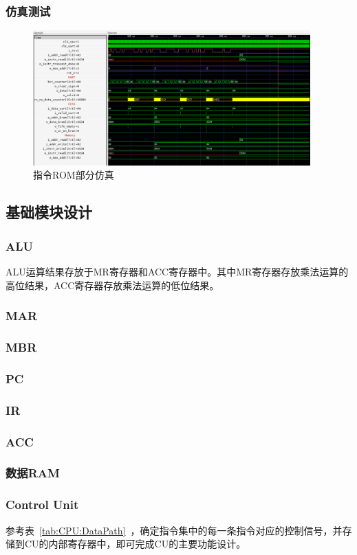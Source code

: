\documentclass[lang=cn,a4paper,newtx]{elegantpaper}
\begin{document}
\subsubsection{仿真测试}
\begin{figure}[htbp]
  \centering
  \includegraphics[width = 0.95\textwidth]{figure/instr_rom_sim.png}
  \caption{指令ROM部分仿真}
\end{figure}
\subsection{基础模块设计}
\subsubsection{ALU}
ALU运算结果存放于MR寄存器和ACC寄存器中。其中MR寄存器存放乘法运算的高位结果，ACC寄存器存放乘法运算的低位结果。
\subsubsection{MAR}
\subsubsection{MBR}
\subsubsection{PC}
\subsubsection{IR}
\subsubsection{ACC}
\subsubsection{数据RAM}
\subsubsection{Control Unit}
参考表~\ref{tab:CPU:DataPath}~，确定指令集中的每一条指令对应的控制信号，并存储到CU的内部寄存器中，即可完成CU的主要功能设计。
\end{document}

